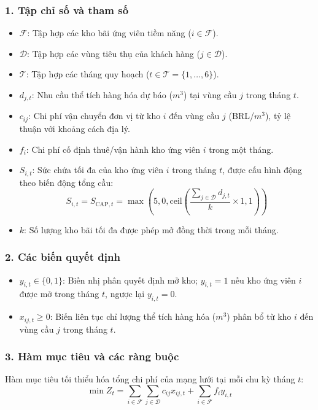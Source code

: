 \subsubsection{1. Tập chỉ số và tham số}
\begin{itemize}
    \item $\mathcal{F}$: Tập hợp các kho bãi ứng viên tiềm năng ($i \in \mathcal{F}$).
    \item $\mathcal{D}$: Tập hợp các vùng tiêu thụ của khách hàng ($j \in \mathcal{D}$).
    \item $\mathcal{T}$: Tập hợp các tháng quy hoạch ($t \in \mathcal{T} = \{1, \dots, 6\}$).
    \item $d_{j,t}$: Nhu cầu thể tích hàng hóa dự báo ($m^3$) tại vùng cầu $j$ trong tháng $t$.
    \item $c_{ij}$: Chi phí vận chuyển đơn vị từ kho $i$ đến vùng cầu $j$ (BRL/$m^3$), tỷ lệ thuận với khoảng cách địa lý.
    \item $f_i$: Chi phí cố định thuê/vận hành kho ứng viên $i$ trong một tháng.
    \item $S_{i,t}$: Sức chứa tối đa của kho ứng viên $i$ trong tháng $t$, được cấu hình động theo biến động tổng cầu:
    \begin{equation}
        S_{i,t} = S_{\text{CAP}, t} = \max\left(5{,}0, \text{ceil}\left(\frac{\sum_{j \in \mathcal{D}} d_{j,t}}{k} \times 1{,}1\right)\right)
    \end{equation}
    \item $k$: Số lượng kho bãi tối đa được phép mở đồng thời trong mỗi tháng.
\end{itemize}

\subsubsection{2. Các biến quyết định}
\begin{itemize}
    \item $y_{i,t} \in \{0, 1\}$: Biến nhị phân quyết định mở kho; $y_{i,t} = 1$ nếu kho ứng viên $i$ được mở trong tháng $t$, ngược lại $y_{i,t} = 0$.
    \item $x_{ij,t} \ge 0$: Biến liên tục chỉ lượng thể tích hàng hóa ($m^3$) phân bổ từ kho $i$ đến vùng cầu $j$ trong tháng $t$.
\end{itemize}

\subsubsection{3. Hàm mục tiêu và các ràng buộc}
Hàm mục tiêu tối thiểu hóa tổng chi phí của mạng lưới tại mỗi chu kỳ tháng $t$:
\begin{equation}
    \min Z_t = \sum_{i \in \mathcal{F}} \sum_{j \in \mathcal{D}} c_{ij} x_{ij,t} + \sum_{i \in \mathcal{F}} f_i y_{i,t}
\end{equation}

